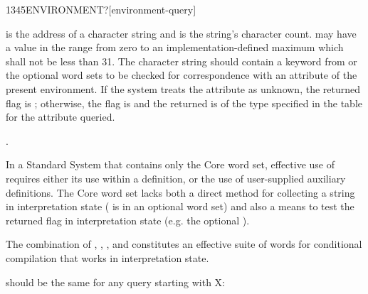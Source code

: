 \begin{worddef}[ENVIRONMENTq]{1345}{ENVIRONMENT?}[environment-query]
\item {}

	 is the address of a character string and 
	is the string's character count.  may have a value in
	the range from zero to an implementation-defined maximum which
	shall not be less than 31. The character string should contain a
	keyword from  or the
	optional word sets to be checked for correspondence with an
	attribute of the present environment. If the system treats the
	attribute as unknown, the returned flag is ;
	otherwise, the flag is  and the  returned
	is of the type specified in the table for the attribute queried.

\see {}.

	\begin{rationale} %
		In a Standard System that contains only the Core word set,
		effective use of  requires either its use
		within a definition, or the use of user-supplied auxiliary
		definitions. The Core word set lacks both a direct method for
		collecting a string in interpretation state (
		is in an optional word set) and also a means to test the
		returned flag in interpretation state (e.g. the optional
		).

		The combination of
		,
		,
		,
		 and
		constitutes an effective suite of words for conditional
		compilation that works in interpretation state.
	\end{rationale}

	\begin{testing} %
		 should be the same for any query starting with X: \\
		 \\
	\end{testing}
\end{worddef}


